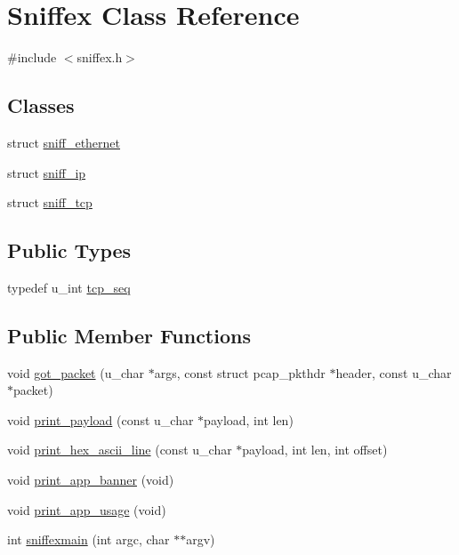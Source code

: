 \hypertarget{classSniffex}{}\section{Sniffex Class Reference}
\label{classSniffex}


{\ttfamily \#include $<$sniffex.\+h$>$}

\subsection*{Classes}
\begin{DoxyCompactItemize}
\item 
struct \mbox{\hyperlink{structSniffex_1_1sniff__ethernet}{sniff\+\_\+ethernet}}
\item 
struct \mbox{\hyperlink{structSniffex_1_1sniff__ip}{sniff\+\_\+ip}}
\item 
struct \mbox{\hyperlink{structSniffex_1_1sniff__tcp}{sniff\+\_\+tcp}}
\end{DoxyCompactItemize}
\subsection*{Public Types}
\begin{DoxyCompactItemize}
\item 
typedef u\+\_\+int \mbox{\hyperlink{classSniffex_a83629f6a3ec687dd2bb381e9bf157d4f}{tcp\+\_\+seq}}
\end{DoxyCompactItemize}
\subsection*{Public Member Functions}
\begin{DoxyCompactItemize}
\item 
void \mbox{\hyperlink{classSniffex_a3d4ef3c90e55035eadca2d577004cd14}{got\+\_\+packet}} (u\+\_\+char $\ast$args, const struct pcap\+\_\+pkthdr $\ast$header, const u\+\_\+char $\ast$packet)
\item 
void \mbox{\hyperlink{classSniffex_a1b24163d441d38f3672800c3de85d149}{print\+\_\+payload}} (const u\+\_\+char $\ast$payload, int len)
\item 
void \mbox{\hyperlink{classSniffex_aec1e34cb4b2ff906304f957c205707ea}{print\+\_\+hex\+\_\+ascii\+\_\+line}} (const u\+\_\+char $\ast$payload, int len, int offset)
\item 
void \mbox{\hyperlink{classSniffex_ab32951f576e7cd62caf4fe1c5b085b4e}{print\+\_\+app\+\_\+banner}} (void)
\item 
void \mbox{\hyperlink{classSniffex_aea81794fe2ac6e2b857eef01c3b109e5}{print\+\_\+app\+\_\+usage}} (void)
\item 
int \mbox{\hyperlink{classSniffex_a41e146d588c285c94c0beee223d8552b}{sniffexmain}} (int argc, char $\ast$$\ast$argv)
\end{DoxyCompactItemize}



